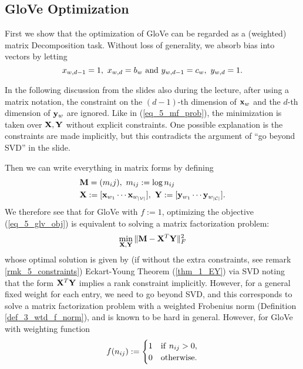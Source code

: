 \documentclass[../main.tex]{subfiles}
\begin{document}
\subsection{GloVe Optimization}
First we show that the optimization of GloVe can be regarded as a (weighted) matrix Decomposition task. Without loss of generality, we absorb bias into vectors by letting
\begin{equation*}
x_{w,d-1}=1,\ x_{w,d}=b_w\ {\rm and}\ y_{w,d-1}=c_w,\ y_{w,d}=1.
\end{equation*}
\begin{remark}\label{rmk_5_constraints}
	In the following discussion from the slides also during the lecture, after using a matrix notation, the constraint on the $(d-1)$-th dimension of ${\bf x}_w$ and the $d$-th dimension of ${\bf y}_w$ are ignored. Like in (\ref{eq_5_mf_prob}), the minimization is taken over ${\bf X,Y}$ without explicit constraints. One possible explanation is the constraints are made implicitly, but this contradicts the argument of ``go beyond SVD'' in the slide. 
\end{remark}
Then we can write everything in matrix forms by defining
\begin{align*}
&{\bf M}=(m_ij),\ m_{ij}:=\log n_{ij}\\
&{\bf X}:=[{\bf x}_{w_1}\cdots{\bf x}_{w_{|\mathcal{V}|}}],\ {\bf Y}:=[{\bf y}_{w_1}\cdots {\bf y}_{w_{|\mathcal{C}|}}].
\end{align*}
We therefore see that for GloVe with $f:=1$, optimizing the objective (\ref{eq_5_glv_obj}) is equivalent to solving a matrix factorization problem:
\begin{equation}\label{eq_5_mf_prob}
\min_{\bf X,Y}\|{\bf M}-{\bf X}^T{\bf Y}\|^2_F
\end{equation}
whose optimal solution is given by (if without the extra constraints, see remark \ref{rmk_5_constraints}) Eckart-Young Theorem (\ref{thm_1_EY}) via SVD noting that the form ${\bf X}^T{\bf Y}$ implies a rank constraint implicitly. However, for a general fixed weight for each entry, we need to go beyond SVD, and this corresponds to solve a matrix factorization problem with a weighted Frobenius norm (Definition \ref{def_3_wtd_f_norm}), and is known to be hard in general. However, for GloVe with weighting function 
\begin{equation*}
f(n_{ij}):=\begin{cases}
1 & {\rm if}\ n_{ij}>0,\\
0 & {\rm otherwise}.
\end{cases}
\end{equation*}
\end{document}
